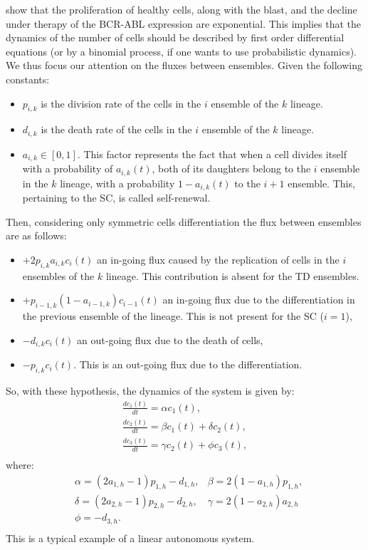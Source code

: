 \documentclass[a4paper,10pt]{article}
\begin{document}
show that the proliferation of healthy cells, along with the 
blast, and the decline under therapy of the BCR-ABL expression are exponential. 
This implies that the dynamics of the number of cells should be described
by first order differential equations
(or by a binomial process, if one wants to use probabilistic dynamics).\\
We thus focus our attention on the fluxes
between ensembles. Given the following constants:
\begin{itemize}
\item $p_{i,k}$ is the division rate of the cells in the $i$ ensemble of the $k$ lineage.
\item $d_{i,k}$ is the death rate of the cells in the $i$ ensemble of the $k$ lineage.
\item $a_{i,k}\in [0,1]$.
This factor represents the fact that when a cell divides itself
with a probability of $a_{i,k}(t)$, both of its daughters belong to the $i$ ensemble in the $k$ lineage,
with a probability $1-a_{i,k}(t)$ to the $i+1$ ensemble. This, pertaining to the SC, is called self-renewal.
\end{itemize}
Then, considering only symmetric cells differentiation
the flux between ensembles are as follows:
\begin{itemize}
\item $+2p_{i,k}a_{i,k}c_i(t)$ 
an in-going flux caused by the replication of cells in the $i$ ensembles of the $k$ lineage. 
This contribution is absent for the TD ensembles.
\item $+p_{i-1,k}(1-a_{i-1,k})c_{i-1}(t)$ 
an in-going flux due to the differentiation in the previous ensemble of the lineage. This is not present for the
SC ($i=1$),
\item $-d_{i,k}c_{i}(t)$ an out-going flux due to the death of cells, 
\item $-p_{i,k}c_{i}(t)$. This is an out-going flux due to the differentiation.
\end{itemize}

So, with these hypothesis, the dynamics of the system is given by:
\begin{equation}
\begin{array}{ll}
\frac{dc_{1}(t)}{dt}=\alpha c_{1}(t), \\
\frac{dc_{2}(t)}{dt}=\beta c_{1}(t)+\delta c_{2}(t),\\
\frac{dc_{3}(t)}{dt}= \gamma c_{2}(t)+ \phi c_{3}(t),\\
\end{array}
\label{eq:sist-unregolated}
\end{equation}
where:
\begin{equation}
\begin{array}{lll}
&\alpha=(2a_{1,h}-1)p_{1,h}-d_{1,h},& \beta=2(1-a_{1,h})p_{1,h}, \\
&\delta=(2a_{2,h}-1)p_{2,h}-d_{2,h},& \gamma=2(1-a_{2,h})a_{2,h} \\
&\phi=-d_{3,h}.& \\
\end{array}
\end{equation} 
This is a typical  example of a linear autonomous system.
\end{document}
